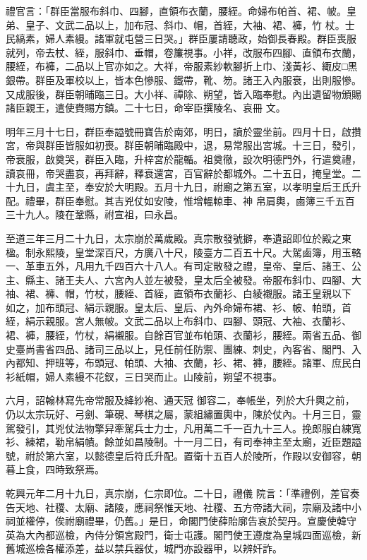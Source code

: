 \begin{pinyinscope}
 禮官言：「群臣當服布斜巾、四腳，直領布衣蘭，腰絰。命婦布帕首、裙、帔。皇弟、皇子、文武二品以上，加布冠、斜巾、帽，首絰，大袖、裙、褲，竹
 杖。士民縞素，婦人素縵。諸軍就屯營三日哭。」群臣屢請聽政，始御長春殿。群臣喪服就列，帝去杖、絰，服斜巾、垂帽，卷簾視事。小祥，改服布四腳、直領布衣蘭，腰絰，布褲，二品以上官亦如之。大祥，帝服素紗軟腳折上巾、淺黃衫、緅皮□黑銀帶。群臣及軍校以上，皆本色慘服、鐵帶，靴、笏。諸王入內服衰，出則服慘。又成服後，群臣朝晡臨三日。大小祥、禫除、朔望，皆入臨奉慰。內出遺留物頒賜諸臣親王，遣使賚賜方鎮。二十七日，命宰臣撰陵名、哀冊
 文。



 明年三月十七日，群臣奉謚號冊寶告於南郊，明日，讀於靈坐前。四月十日，啟攢宮，帝與群臣皆服如初喪。群臣朝晡臨殿中，退，易常服出宮城。十三日，發引，帝衰服，啟奠哭，群臣入臨，升梓宮於龍輴。祖奠徹，設次明德門外，行遣奠禮，讀哀冊，帝哭盡哀，再拜辭，釋衰還宮，百官辭於都城外。二十五日，掩皇堂。二十九日，虞主至，奉安於大明殿。五月十九日，祔廟之第五室，以孝明皇后王氏升配。禮畢，群臣奉慰。其吉兇仗如安陵，惟增轀輬車、神
 帛肩輿，鹵簿三千五百三十九人。陵在鞏縣，祔宣祖，曰永昌。



 至道三年三月二十九日，太宗崩於萬歲殿。真宗散發號擗，奉遺詔即位於殿之東楹。制永熙陵，皇堂深百尺，方廣八十尺，陵臺方二百五十尺。大駕鹵簿，用玉輅一、革車五外，凡用九千四百六十八人。有司定散發之禮，皇帝、皇后、諸王、公主、縣主、諸王夫人、六宮內人並左被發，皇太后全被發。帝服布斜巾、四腳、大袖、裙、褲、帽，竹杖，腰絰、首絰，直領布衣蘭衫、白綾襯服。諸王皇親以下
 如之，加布頭冠、絹示親服。皇太后、皇后、內外命婦布裙、衫、帔、帕頭，首絰，絹示親服。宮人無帔。文武二品以上布斜巾、四腳、頭冠、大袖、衣蘭衫、裙、褲，腰絰，竹杖，絹襯服。自餘百官並布帕頭、衣蘭衫，腰絰。兩省五品、御史臺尚書省四品、諸司三品以上，見任前任防禦、團練、刺史，內客省、閣門、入內都知、押班等，布頭冠、帕頭、大袖、衣蘭，衫、裙、褲，腰絰。諸軍、庶民白衫紙帽，婦人素縵不花釵，三日哭而止。山陵前，朔望不視事。



 六月，詔翰林寫先帝常服及絳紗袍、通天冠
 御容二，奉帳坐，列於大升輿之前，仍以太宗玩好、弓劍、筆硯、琴棋之屬，蒙組繡置輿中，陳於仗內。十月三日，靈駕發引，其兇仗法物擎舁牽駕兵士力士，凡用萬二千一百九十三人。挽郎服白練寬衫、練裙，勒帛絹幘。餘並如昌陵制。十一月二日，有司奉神主至太廟，近臣題謚號，祔於第六室，以懿德皇后符氏升配。置衛十五百人於陵所，作殿以安御容，朝暮上食，四時致祭焉。



 乾興元年二月十九日，真宗崩，仁宗即位。二十日，禮儀
 院言：「準禮例，差官奏告天地、社稷、太廟、諸陵，應祠祭惟天地、社稷、五方帝諸大祠，宗廟及諸中小祠並權停，俟祔廟禮畢，仍舊。」是日，命閣門使薛貽廓告哀於契丹。宣慶使韓守英為大內都巡檢，內侍分領宮殿門，衛士屯護。閣門使王遵度為皇城四面巡檢，新舊城巡檢各權添差，益以禁兵器仗，城門亦設器甲，以辨奸詐。




\end{pinyinscope}
